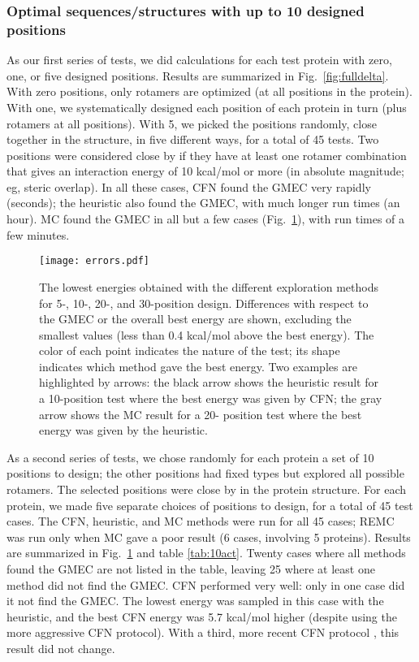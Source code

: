 \subsubsection{Optimal sequences/structures with up to 10 designed positions}
As our first series of tests, we did calculations for each test protein with zero, one, or five designed positions. Results are summarized in Fig.\ \ref{fig:fulldelta}. With zero positions, only rotamers are optimized (at all positions in the protein). With one, we systematically designed each position of each protein in turn (plus rotamers at all positions). With 5, we picked the positions randomly, close together in the structure, in five different ways, for a total of 45 tests. Two positions were considered close by if they have at least one rotamer combination that gives an interaction energy of 10 kcal/mol or more (in absolute magnitude; eg, steric overlap). In all these cases, CFN found the GMEC very rapidly (seconds); the heuristic also found the GMEC, with much longer run times (an hour). MC found the GMEC in all but a few cases (Fig.\ \ref{fig:errors}), with run times of a few minutes. 

\begin{figure}[!htbp]
  \begin{center}
    \texttt{[image: errors.pdf]} 
  \end{center}
  \caption{The lowest energies obtained with the different exploration
methods for 5-, 10-, 20-, and 30-position design. Differences with respect
to the GMEC or the overall best energy are shown, excluding the smallest
values (less than 0.4 kcal/mol above the best energy). The color of each
point indicates the nature of the test; its shape indicates which method
gave the best energy. Two examples are highlighted by arrows: the black
arrow shows the heuristic result for a 10-position test where the best
energy was given by CFN; the gray arrow shows the MC result for a 20-
position test where the best energy was given by the heuristic. 
}
      \label{fig:errors}
\end{figure}

As a second series of tests, we chose randomly for each protein a set of 10 positions to design; the other positions had fixed types but explored all possible rotamers. The selected positions were close by in the protein structure. For each protein, we made five separate choices of positions to design, for a total of 45 test cases. The CFN, heuristic, and MC methods were run for all 45 cases; REMC was run only when MC gave a poor result (6 cases, involving 5 proteins).
Results are summarized in Fig.\ \ref{fig:errors} and table \ref{tab:10act}. Twenty cases where all methods found the GMEC are not listed in the table, leaving 25 where at least one method did not find the GMEC. CFN performed very well: only in one case did it not find the GMEC. The lowest energy was sampled in this case with the heuristic, and the best CFN energy was 5.7 kcal/mol higher (despite using the more aggressive CFN protocol). With a third, more recent CFN protocol \cite{Simoncini15}, this result did not change. 


